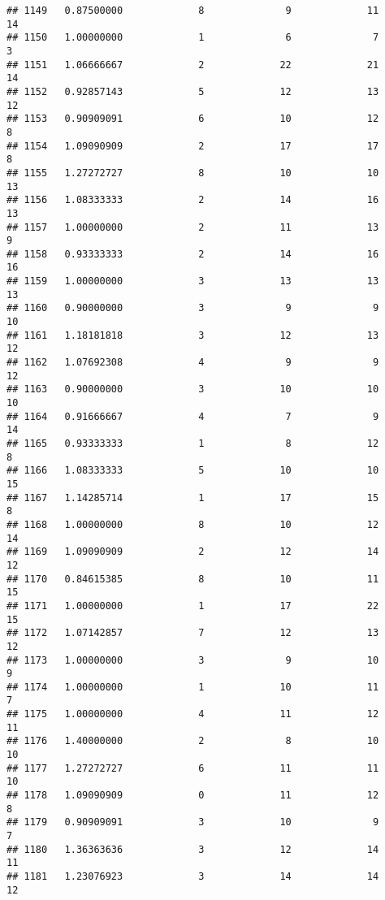 \documentclass[
]{article}
\begin{document}
\begin{verbatim}
## 1149   0.87500000             8              9             11             14
## 1150   1.00000000             1              6              7              3
## 1151   1.06666667             2             22             21             14
## 1152   0.92857143             5             12             13             12
## 1153   0.90909091             6             10             12              8
## 1154   1.09090909             2             17             17              8
## 1155   1.27272727             8             10             10             13
## 1156   1.08333333             2             14             16             13
## 1157   1.00000000             2             11             13              9
## 1158   0.93333333             2             14             16             16
## 1159   1.00000000             3             13             13             13
## 1160   0.90000000             3              9              9             10
## 1161   1.18181818             3             12             13             12
## 1162   1.07692308             4              9              9             12
## 1163   0.90000000             3             10             10             10
## 1164   0.91666667             4              7              9             14
## 1165   0.93333333             1              8             12              8
## 1166   1.08333333             5             10             10             15
## 1167   1.14285714             1             17             15              8
## 1168   1.00000000             8             10             12             14
## 1169   1.09090909             2             12             14             12
## 1170   0.84615385             8             10             11             15
## 1171   1.00000000             1             17             22             15
## 1172   1.07142857             7             12             13             12
## 1173   1.00000000             3              9             10              9
## 1174   1.00000000             1             10             11              7
## 1175   1.00000000             4             11             12             11
## 1176   1.40000000             2              8             10             10
## 1177   1.27272727             6             11             11             10
## 1178   1.09090909             0             11             12              8
## 1179   0.90909091             3             10              9              7
## 1180   1.36363636             3             12             14             11
## 1181   1.23076923             3             14             14             12

\end{verbatim}
\end{document}
